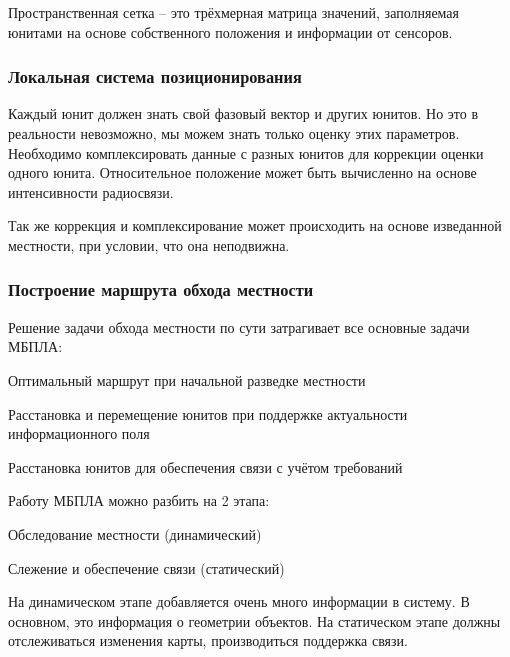 Пространственная сетка -- это трёхмерная матрица значений, заполняемая
юнитами на основе собственного положения и информации от сенсоров.

\subsubsection{Локальная система позиционирования}

Каждый юнит должен знать свой фазовый вектор и других юнитов.
Но это в реальности невозможно, мы можем знать только
оценку этих параметров. Необходимо комплексировать данные с разных
юнитов для коррекции оценки одного юнита. Относительное положение
может быть вычисленно на основе интенсивности радиосвязи.

Так же коррекция и комплексирование может происходить на основе
изведанной местности, при условии, что она неподвижна.

\subsubsection{Построение маршрута обхода местности}

Решение задачи обхода местности по сути затрагивает все основные задачи
МБПЛА:

\begin{mintemize}
\item Оптимальный маршрут при начальной разведке местности
\item Расстановка и перемещение юнитов при поддержке
    актуальности информационного поля
\item Расстановка юнитов для обеспечения связи с учётом требований
\end{mintemize}

Работу МБПЛА можно разбить на 2 этапа:
\begin{mintemize}
\item Обследование местности (динамический)
\item Слежение и обеспечение связи (статический)
\end{mintemize}

На динамическом этапе добавляется очень много информации в систему.
В основном, это информация о геометрии объектов. На статическом этапе
должны отслеживаться изменения карты, производиться поддержка связи.


